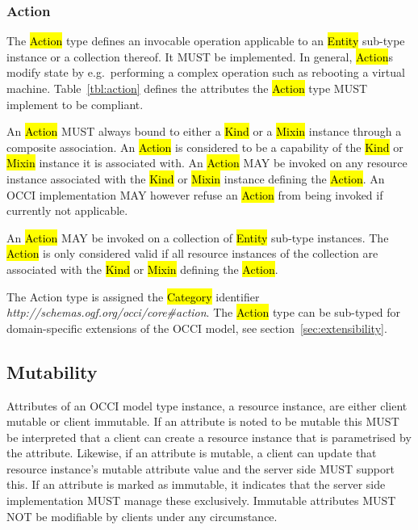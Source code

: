 \documentclass[10pt,a4paper,british]{article}
\begin{document}
\subsubsection{Action}
The \hl{Action} type defines an invocable operation applicable to an \hl{Entity}
sub-type instance or a collection thereof. It MUST be implemented. In general,
\hl{Action}s modify state by e.g.~performing a complex operation such as
rebooting a virtual machine.
%
Table~\ref{tbl:action} defines the attributes the \hl{Action} type MUST
implement to be compliant.


An \hl{Action} MUST always bound to either a \hl{Kind} or a \hl{Mixin} instance
through a composite association. An \hl{Action} is considered to be a
capability of the \hl{Kind} or \hl{Mixin} instance it is associated with.  An
\hl{Action} MAY be invoked on any resource instance associated with the
\hl{Kind} or \hl{Mixin} instance defining the \hl{Action}. An OCCI
implementation MAY however refuse an \hl{Action} from being invoked if
currently not applicable.

An \hl{Action} MAY be invoked on a collection of \hl{Entity} sub-type
instances. The \hl{Action} is only considered valid if all resource instances
of the collection are associated with the \hl{Kind} or \hl{Mixin} defining the
\hl{Action}.

The Action type is assigned the \hl{Category} identifier
\textit{http://schemas.ogf.org/occi/core\#action}.
%
The \hl{Action} type can be sub-typed for domain-specific extensions of the
OCCI model, see section~\ref{sec:extensibility}.

\subsection{Mutability}
Attributes of an OCCI model type instance, a resource instance, are
either client mutable or client immutable. If an attribute is noted to
be mutable this MUST be interpreted that a client can create a
resource instance that is parametrised by the attribute. Likewise, if
an attribute is mutable, a client can update that resource instance's
mutable attribute value and the server side MUST support this. If an
attribute is marked as immutable, it indicates that the server side
implementation MUST manage these exclusively. Immutable attributes
MUST NOT be modifiable by clients under any circumstance.
\end{document}

